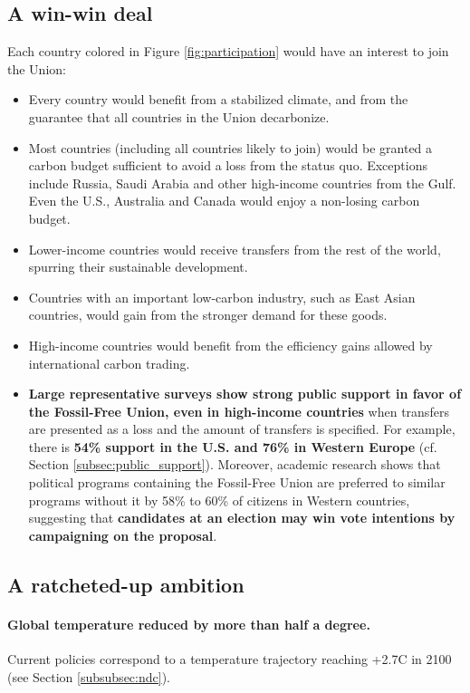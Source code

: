 \documentclass[12pt,english]{article}
\begin{document}
\subsection{A win-win deal\label{subsec:winwin}}

Each country colored in Figure \ref{fig:participation} would have an interest to join the Union: 
\begin{itemize}
  \item Every country would benefit from a stabilized climate, and from the guarantee that all countries in the Union decarbonize.
  \item Most countries (including all countries likely to join) would be granted a carbon budget sufficient to avoid a loss from the status quo. Exceptions include Russia, Saudi Arabia and other high-income countries from the Gulf. Even the U.S., Australia and Canada would enjoy a non-losing carbon budget.
  \item Lower-income countries would receive transfers from the rest of the world, spurring their sustainable development.
  \item Countries with an important low-carbon industry, such as East Asian countries, would gain from the stronger demand for these goods.
  \item High-income countries would benefit from the efficiency gains allowed by international carbon trading.
  \item \textbf{Large representative surveys show strong public support in favor of the Fossil-Free Union, even in high-income countries} when transfers are presented as a loss and the amount of transfers is specified. For example, there is\textbf{ 54\% support in the U.S. and 76\% in Western Europe} (cf. Section \ref{subsec:public_support}).\cite{fabre_majority_2025} 
  Moreover, academic research shows that political programs containing the Fossil-Free Union are preferred to similar programs without it by 58\% to 60\% of citizens in Western countries, suggesting that \textbf{candidates at an election may win vote intentions by campaigning on the proposal}.\cite{fabre_majority_2025}
\end{itemize}

\subsection{A ratcheted-up ambition\label{subsec:ambition}}

\paragraph{Global temperature reduced by more than half a degree.}
Current policies correspond to a temperature trajectory reaching +2.7\textdegree{}C in 2100 (see Section \ref{subsubsec:ndc}). %
\end{document}
